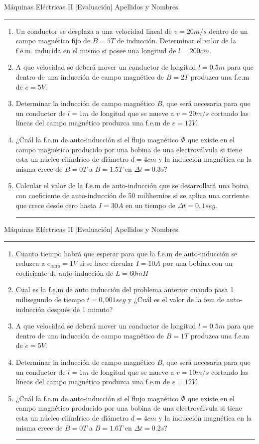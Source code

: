 \documentclass[./eval.tex]{subfiles}
\newcommand{\head}{\noindent Máquinas Eléctricas II |Evaluación| Apellidos y Nombres.
\rule{10cm}{0.1mm}}
\newcommand{\separador}{\noindent\rule{\paperwidth}{0.1mm}\newline}
\begin{document}
\head

 \begin{enumerate}
 \item Un conductor se desplaza a una velocidad lineal de $v=20m/s$ dentro de un campo magnético fijo de $B=5T$ de inducción. Determinar el valor de la f.e.m. inducida en el mismo si posee una longitud de $l=200cm$.
    \item A que velocidad se deberá mover un conductor de longitud $l=0.5m$ para que dentro de una inducción de campo magnético de $B=2T$ produzca una f.e.m de $e=5V$.
    \item Determinar la inducción de campo magnético $B$, que será necesaria para que un conductor de $l=1m$ de longitud que se mueve a $v=20m/s$ cortando las líneas del campo magnético produzca una f.e.m de $e=12V$.
    \item ¿Cuál la f.e.m de auto-inducción si el flujo magnético $\Phi$ que existe en el campo magnético producido por una bobina de una electroválvula si tiene esta un núcleo cilíndrico de diámetro $d=4cm$ y la inducción magnética en la misma crece de $B=0T$ a $B=1.5T$ en $\Delta t=0.3s$?
    \item Calcular el valor de la f.e.m de auto-inducción que se desarrollará una boina con coeficiente de auto-inducción de 50 milihernios si se aplica una corriente que crece desde cero hasta $I=30A$ en un tiempo de $\Delta t=0,1 seg.$
    \separador
    \end{enumerate}
 \head
    \begin{enumerate}
        
    \item Cuanto tiempo habrá que esperar para que la f.e.m de auto-inducción se reduzca a $e_{auto}=1V$ si se hace circular $I=10A$ por una bobina con un coeficiente de auto-inducción de $L=60 mH$  
    \item Cual es la f.e.m de auto inducción del problema anterior cuando pasa 1 milisegundo de tiempo $t=0,001seg$ y ¿Cuál es el valor de la fem de auto-inducción después de 1 minuto?
    \item A que velocidad se deberá mover un conductor de longitud $l=0.5m$ para que dentro de una inducción de campo magnético de $B=1T$ produzca una f.e.m de $e=5V$.
    \item Determinar la inducción de campo magnético $B$, que será necesaria para que un conductor de $l=1m$ de longitud que se mueve a $v=10m/s$ cortando las líneas del campo magnético produzca una f.e.m de $e=12V$.
    \item ¿Cuál la f.e.m de auto-inducción si el flujo magnético $\Phi$ que existe en el campo magnético producido por una bobina de una electroválvula si tiene esta un núcleo cilíndrico de diámetro $d=4cm$ y la inducción magnética en la misma crece de $B=0T$ a $B=1.6T$ en $\Delta t=0.2s$?
    
       \separador
 \end{enumerate}
\end{document}
